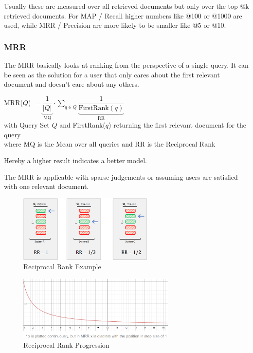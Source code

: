 \documentclass[
../../NLP4W_Summary.tex,
]
{subfiles}
\begin{document}
Usually these are measured over all retrieved documents but only over the top @k retrieved documents. For MAP / Recall higher numbers like @100 or @1000 are used, while MRR / Precision are more likely to be smaller like @5 or @10.

\subsubsection{MRR}
\begin{defbox}
    The MRR basically looks at ranking from the perspective of a single query. It can be seen as the solution for a user that only cares about the first relevant document and doesn't care about any others. 
    \begin{center}
        \begin{smallmathbox*}
            \shortstack
            {MRR($Q$) $= \underbrace{\dfrac{1}{|Q|}}_{\text{MQ}} \cdot \sum\limits_{q \in Q} \underbrace{\dfrac{1}{\text{FirstRank}(q)}}_{\text{RR}}$\\
            with Query Set $Q$ and FirstRank($q$) returning the first relevant document for the query\\
            where MQ is the Mean over all queries and RR is the Reciprocal Rank}
        \end{smallmathbox*}
        Hereby a higher result indicates a better model.
    \end{center}

    The MRR is applicable with sparse judgements or assuming users are satisfied with one relevant document.
\end{defbox}

\begin{figure}
    [htp]
    \centering
    \includegraphics[width=0.6\textwidth]{Pics/MRRExample.png}
    \caption{Reciprocal Rank Example}
\end{figure}

\begin{figure}
    [htp]
    \centering
    \includegraphics[width=0.7\textwidth]{Pics/MRRPlot.png}
    \caption{Reciprocal Rank Progression}
\end{figure}
\end{document}
